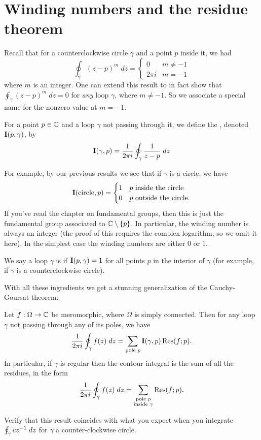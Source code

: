 \section{Winding numbers and the residue theorem}
Recall that for a counterclockwise circle $\gamma$ and a point $p$ inside it, we had
\[
	\oint_{\gamma} (z-p)^m \; dz =
	\begin{cases}
		0 & m \neq -1 \\
		2\pi i & m = -1
	\end{cases}
\]
where $m$ is an integer.
One can extend this result to in fact show that $\oint_\gamma (z-p)^m \; dz = 0$
for \emph{any} loop $\gamma$, where $m \neq -1$.
So we associate a special name for the nonzero value at $m=-1$.
\begin{definition}
	For a point $p \in \mathbb C$ and a loop $\gamma$ not passing through it,
	we define the , denoted $\operatorname{\mathbf I}(p, \gamma)$, by
	\[
		\operatorname{\mathbf I}(\gamma, p) = \frac{1}{2\pi i} \oint_{\gamma} \frac{1}{z-p} \; dz
	\]
\end{definition}
For example, by our previous results we see that if $\gamma$ is a circle, we have
\[
	\operatorname{\mathbf I}(\text{circle}, p)
	=
	\begin{cases}
		1 & \text{$p$ inside the circle} \\
		0 & \text{$p$ outside the circle}.
	\end{cases}
\]
If you've read the chapter on fundamental groups, then this is just the fundamental group
associated to $\mathbb C \setminus \{p\}$.
In particular, the winding number is always an integer (the proof of this requires the complex logarithm,
so we omit it here).
In the simplest case the winding numbers are either $0$ or $1$.
\begin{definition}
	We say a loop $\gamma$ is  if $\operatorname{\mathbf I}(p, \gamma) = 1$
	for all points $p$ in the interior of $\gamma$ (for example,
	if $\gamma$ is a counterclockwise circle).
\end{definition}

With all these ingredients we get a stunning generalization of the Cauchy-Goursat theorem:
\begin{theorem}
	Let $f : \Omega \to \mathbb C$ be meromorphic, where $\Omega$ is simply connected.
	Then for any loop $\gamma$ not passing through any of its poles, we have
	\[
		\frac{1}{2\pi i} \oint_{\gamma} f(z) \; dz
		= \sum_{\text{pole $p$}} \operatorname{\mathbf I}(\gamma, p) \operatorname{Res}(f; p).
	\]
	In particular, if $\gamma$ is regular then the contour integral
	is the sum of all the residues, in the form
	\[
		\frac{1}{2\pi i} \oint_{\gamma} f(z) \; dz
		= \sum_{\substack{\text{pole $p$} \\ \text{inside $\gamma$}}}  \operatorname{Res}(f; p).
	\]
\end{theorem}
\begin{ques}
	Verify that this result coincides
	with what you expect when you integrate $\oint_\gamma cz^{-1} \; dz$
	for $\gamma$ a counter-clockwise circle.
\end{ques}

